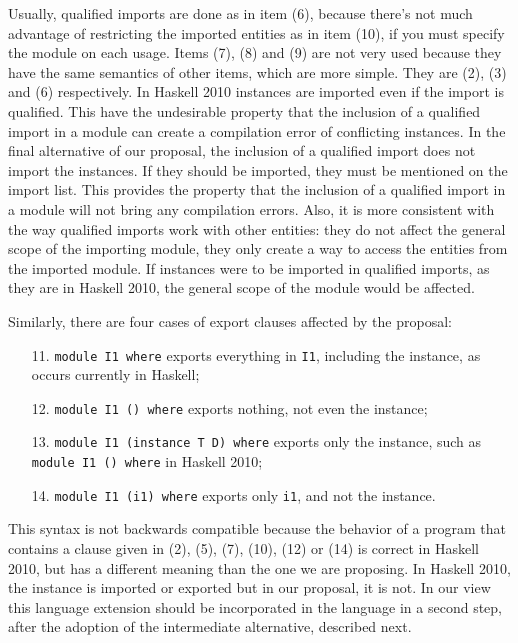 \documentclass[msc]{ppgccufmg}
\begin{document}
Usually, qualified imports are done as in item (6), because there's not much advantage of restricting the imported entities as in item (10), if you must specify the module on each usage.
Items (7), (8) and (9) are not very used because they have the same semantics of other items, which are more simple.
They are (2), (3) and (6) respectively.
In Haskell 2010 instances are imported even if the import is qualified.
This have the undesirable property that the inclusion of a qualified import in a module can create a compilation error of conflicting instances.
In the final alternative of our proposal, the inclusion of a qualified import does not import the instances.
If they should be imported, they must be mentioned on the import list.
This provides the property that the inclusion of a qualified import in a module will not bring any compilation errors.
Also, it is more consistent with the way qualified imports work with other entities: they do not affect the general scope of the importing module, they only create a way to access the entities from the imported module.
If instances were to be imported in qualified imports, as they are in Haskell 2010, the general scope of the module would be affected.

Similarly, there are four cases of export clauses affected by the proposal:
\begin{enumerate}
\item[11.] \texttt{module I1 where} exports everything in \texttt{I1}, including the
instance, as occurs currently in Haskell;
\item[12.] \texttt{module I1 () where} exports nothing, not even the
  instance;
\item[13.] \texttt{module I1 (instance T D) where} exports only the
  instance, such as \texttt{module I1 () where} in Haskell 2010;
\item[14.] \texttt{module I1 (i1) where} exports only \texttt{i1}, and not the
instance.
\end{enumerate}

This syntax is not backwards compatible because the behavior of a program that
contains a clause given in (2), (5), (7), (10), (12) or (14) is correct in Haskell 2010, but has a
different meaning than the one we are proposing.  In Haskell 2010, the instance
is imported or exported but in our proposal, it is not.  In our view this language extension should
be incorporated in the language in a second step, after the adoption of the intermediate alternative, described next.
\end{document}
